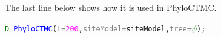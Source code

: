 \documentclass[10pt,letterpaper,table]{article}
\begin{document}
{The last line below shows how it is used in PhyloCTMC.

{\small
  \begin{alltt}  
    \textcolor{green}{D} ~ \textcolor{blue}{PhyloCTMC}(\textcolor{gray}{L=}\textcolor{magenta}{200}, \textcolor{gray}{siteModel=}siteModel, \textcolor{gray}{tree=}\textcolor{green}{\(\psi\)});
  \end{alltt}
}

 









}
\end{document}
